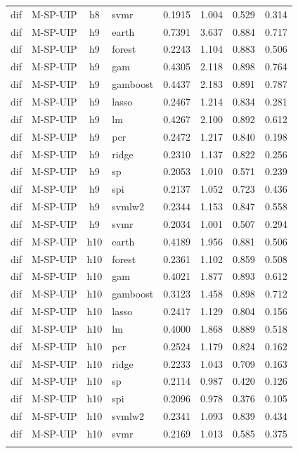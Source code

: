 \begin{ThreePartTable}
\begin{longtable}[t]{llclcccc}
dif & M-SP-UIP & h8 & svmr & 0.1915 & 1.004 & 0.529 & 0.314\\
\addlinespace
dif & M-SP-UIP & h9 & earth & 0.7391 & 3.637 & 0.884 & 0.717\\
dif & M-SP-UIP & h9 & forest & 0.2243 & 1.104 & 0.883 & 0.506\\
dif & M-SP-UIP & h9 & gam & 0.4305 & 2.118 & 0.898 & 0.764\\
dif & M-SP-UIP & h9 & gamboost & 0.4437 & 2.183 & 0.891 & 0.787\\
dif & M-SP-UIP & h9 & lasso & 0.2467 & 1.214 & 0.834 & 0.281\\
dif & M-SP-UIP & h9 & lm & 0.4267 & 2.100 & 0.892 & 0.612\\
dif & M-SP-UIP & h9 & pcr & 0.2472 & 1.217 & 0.840 & 0.198\\
dif & M-SP-UIP & h9 & ridge & 0.2310 & 1.137 & 0.822 & 0.256\\
dif & M-SP-UIP & h9 & sp & 0.2053 & 1.010 & 0.571 & 0.239\\
dif & M-SP-UIP & h9 & spi & 0.2137 & 1.052 & 0.723 & 0.436\\
dif & M-SP-UIP & h9 & svmlw2 & 0.2344 & 1.153 & 0.847 & 0.558\\
dif & M-SP-UIP & h9 & svmr & 0.2034 & 1.001 & 0.507 & 0.294\\
\addlinespace
dif & M-SP-UIP & h10 & earth & 0.4189 & 1.956 & 0.881 & 0.506\\
dif & M-SP-UIP & h10 & forest & 0.2361 & 1.102 & 0.859 & 0.508\\
dif & M-SP-UIP & h10 & gam & 0.4021 & 1.877 & 0.893 & 0.612\\
dif & M-SP-UIP & h10 & gamboost & 0.3123 & 1.458 & 0.898 & 0.712\\
dif & M-SP-UIP & h10 & lasso & 0.2417 & 1.129 & 0.804 & 0.156\\
dif & M-SP-UIP & h10 & lm & 0.4000 & 1.868 & 0.889 & 0.518\\
dif & M-SP-UIP & h10 & pcr & 0.2524 & 1.179 & 0.824 & 0.162\\
dif & M-SP-UIP & h10 & ridge & 0.2233 & 1.043 & 0.709 & 0.163\\
dif & M-SP-UIP & h10 & sp & 0.2114 & 0.987 & 0.420 & 0.126\\
dif & M-SP-UIP & h10 & spi & 0.2096 & 0.978 & 0.376 & 0.105\\
dif & M-SP-UIP & h10 & svmlw2 & 0.2341 & 1.093 & 0.839 & 0.434\\
dif & M-SP-UIP & h10 & svmr & 0.2169 & 1.013 & 0.585 & 0.375\\
\addlinespace

\end{longtable}
\end{ThreePartTable}
